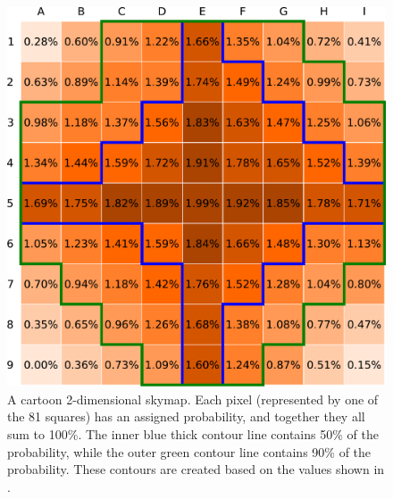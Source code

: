 \begin{colsection}
\begin{colsection}

\begin{figure}[p]
\begin{center}

\includegraphics[width=0.95\linewidth]{images/sim/sim_skymap_probs.pdf}

\end{center}

\caption[An example 2D probability skymap]{A cartoon 2-dimensional skymap. Each pixel (represented by one of the 81 squares) has an assigned probability, and together they all sum to 100\%. The inner blue thick contour line contains 50\% of the probability, while the outer green contour line contains 90\% of the probability. These contours are created based on the values shown in .
}
\label{fig:sim_skymap_probs}
\end{figure}


\begin{figure}[p]
\begin{center}


\end{center}
\end{figure}
\end{colsection}
\end{colsection}
